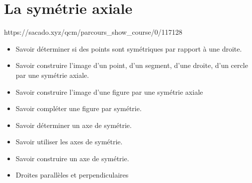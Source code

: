 \chapter{La symétrie axiale}
{https://sacado.xyz/qcm/parcours_show_course/0/117128}
{
\begin{CpsCol}
{\LARGE \textbf{\color{sacado_violet}{Les savoir faire ciblés}}}
\begin{itemize}[leftmargin=*]
\item Savoir déterminer si des points sont symétriques par rapport à une droite.
\item Savoir construire l'image d'un point, d'un segment, d'une droite, d'un cercle par une symétrie axiale.
\item Savoir construire l'image d'une figure par une symétrie axiale
\item Savoir compléter une figure par symétrie.
\item Savoir déterminer un axe de symétrie.
\item Savoir utiliser les axes de symétrie.
\item Savoir construire un axe de symétrie.
\end{itemize}
\end{CpsCol}


\begin{CCon}
{\LARGE \textbf{\color{sacado_violet}{Chapitres connexes spiralés}}}
\begin{itemize}[leftmargin=*]
\item Droites parallèles et perpendiculaires   
\end{itemize}
\end{CCon}

}




